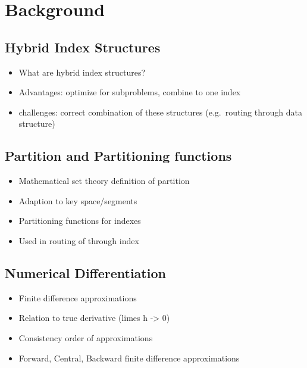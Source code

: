 \thispagestyle{plain}
\chapter{Background}

\section{Hybrid Index Structures}
\begin{itemize}
    \item What are hybrid index structures?
    \item Advantages: optimize for subproblems, combine to one index
    \item challenges: correct combination of these structures (e.g.~routing through data structure)
\end{itemize}

\section{Partition and Partitioning functions}
\begin{itemize}
    \item Mathematical set theory definition of partition
    \item Adaption to key space/segments
    \item Partitioning functions for indexes
    \item Used in routing of through index
\end{itemize}

\section{Numerical Differentiation}
\begin{itemize}
    \item Finite difference approximations
    \item Relation to true derivative (limes h -> 0)
    \item Consistency order of approximations
    \item Forward, Central, Backward finite difference approximations
\end{itemize}

